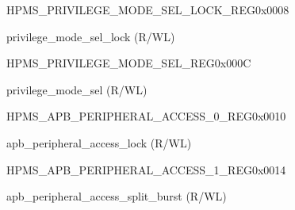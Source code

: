 


\begin{register}{H}{PMS\_PRIVILEGE\_MODE\_SEL\_LOCK\_REG}{0x0008}\label{regdesc:PMSPRIVILEGEMODESELLOCKREG}
%
%
\regnewline%
\begin{regdesc}\begin{reglist}
\label{fielddesc:PMSPRIVILEGEMODESELLOCK}\item [PMS\_PRIVILEGE\_MODE\_SEL\_LOCK] privilege\_mode\_sel\_lock (R/WL)
\end{reglist}\end{regdesc}
\end{register}


\begin{register}{H}{PMS\_PRIVILEGE\_MODE\_SEL\_REG}{0x000C}\label{regdesc:PMSPRIVILEGEMODESELREG}
%
%
\regnewline%
\begin{regdesc}\begin{reglist}
\label{fielddesc:PMSPRIVILEGEMODESEL}\item [PMS\_PRIVILEGE\_MODE\_SEL] privilege\_mode\_sel (R/WL)
\end{reglist}\end{regdesc}
\end{register}


\begin{register}{H}{PMS\_APB\_PERIPHERAL\_ACCESS\_0\_REG}{0x0010}\label{regdesc:PMSAPBPERIPHERALACCESS0REG}
%
%
\regnewline%
\begin{regdesc}\begin{reglist}
\label{fielddesc:PMSAPBPERIPHERALACCESSLOCK}\item [PMS\_APB\_PERIPHERAL\_ACCESS\_LOCK] apb\_peripheral\_access\_lock (R/WL)
\end{reglist}\end{regdesc}
\end{register}


\begin{register}{H}{PMS\_APB\_PERIPHERAL\_ACCESS\_1\_REG}{0x0014}\label{regdesc:PMSAPBPERIPHERALACCESS1REG}
%
%
\regnewline%
\begin{regdesc}\begin{reglist}
\label{fielddesc:PMSAPBPERIPHERALACCESSSPLITBURST}\item [PMS\_APB\_PERIPHERAL\_ACCESS\_SPLIT\_BURST] apb\_peripheral\_access\_split\_burst (R/WL)
\end{reglist}\end{regdesc}
\end{register}


